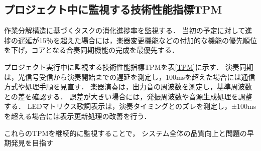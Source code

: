 \documentclass[lualatex,book,openany,paper=a4paper,jafontsize=11.5pt,jafontscale=1.05]{jlreq}
\begin{document}
\subsection{プロジェクト中に監視する技術性能指標TPM}
作業分解構造に基づくタスクの消化進捗率を監視する．
当初の予定に対して進捗の遅延が15％を超えた場合には，楽器変更機能などの付加的な機能の優先順位を下げ，コアとなる合奏同期機能の完成を最優先する．

プロジェクト実行中に監視する技術性能指標TPMを表\ref{TPM}に示す．
演奏同期は，光信号受信から演奏開始までの遅延を測定し，100msを超えた場合には通信方式や処理手順を見直す．
楽器演奏は，出力音の周波数を測定し，基準周波数との差を確認する．
誤差が大きい場合には，発振周波数や音源生成処理を調整する．
LEDマトリクス歌詞表示は，演奏タイミングとのズレを測定し，±100msを超える場合には表示更新処理の改善を行う．

これらのTPMを継続的に監視することで，
システム全体の品質向上と問題の早期発見を目指す
\begin{table}[H]
\centering
\caption{技術性能指標TPM}
\label{TPM}
\end{table}


\end{document}
